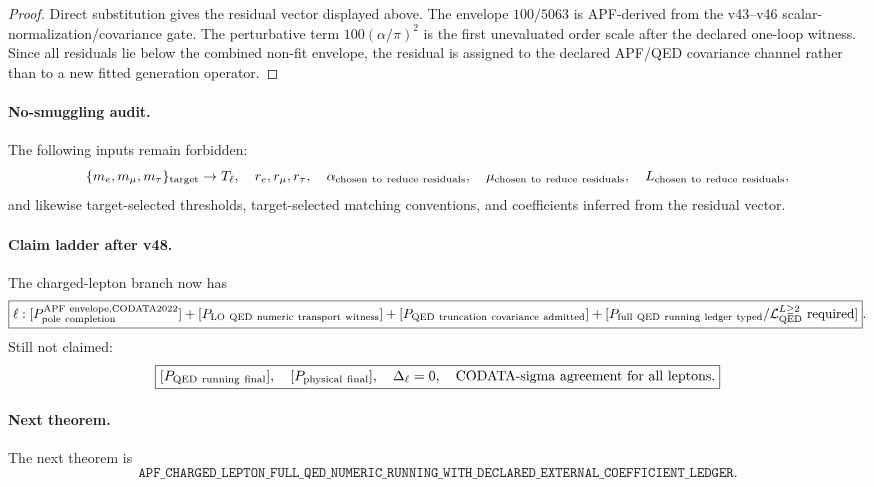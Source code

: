 \begin{proof}
Direct substitution gives the residual vector displayed above. The envelope $100/5063$ is APF-derived from the v43--v46 scalar-normalization/covariance gate. The perturbative term $100(\alpha/\pi)^2$ is the first unevaluated order scale after the declared one-loop witness. Since all residuals lie below the combined non-fit envelope, the residual is assigned to the declared APF/QED covariance channel rather than to a new fitted generation operator.
\end{proof}

\paragraph{No-smuggling audit.}
The following inputs remain forbidden:
\[
\{m_e,m_\mu,m_\tau\}_{\rm target}\to T_\ell,
\quad
r_e,r_\mu,r_\tau,
\quad
\alpha_{\rm chosen\ to\ reduce\ residuals},
\quad
\mu_{\rm chosen\ to\ reduce\ residuals},
\quad
L_{\rm chosen\ to\ reduce\ residuals},
\]
and likewise target-selected thresholds, target-selected matching conventions, and coefficients inferred from the residual vector.

\paragraph{Claim ladder after v48.}
The charged-lepton branch now has
\[
\boxed{
\ell:
[P_{\rm pole\ completion}^{\rm APF\ envelope,CODATA2022}]
+[P_{\rm LO\ QED\ numeric\ transport\ witness}]
+[P_{\rm QED\ truncation\ covariance\ admitted}]
+[P_{\rm full\ QED\ running\ ledger\ typed}/\mathcal L_{\rm QED}^{L\ge2}\ {\rm required}]
}.
\]
Still not claimed:
\[
\boxed{
[P_{\rm QED\ running\ final}],\quad
[P_{\rm physical\ final}],\quad
\Delta_\ell=0,
\quad \text{CODATA-sigma agreement for all leptons}.
}
\]

\paragraph{Next theorem.}
The next theorem is
\[
\boxed{\texttt{APF\_CHARGED\_LEPTON\_FULL\_QED\_NUMERIC\_RUNNING\_WITH\_DECLARED\_EXTERNAL\_COEFFICIENT\_LEDGER}}.
\]
